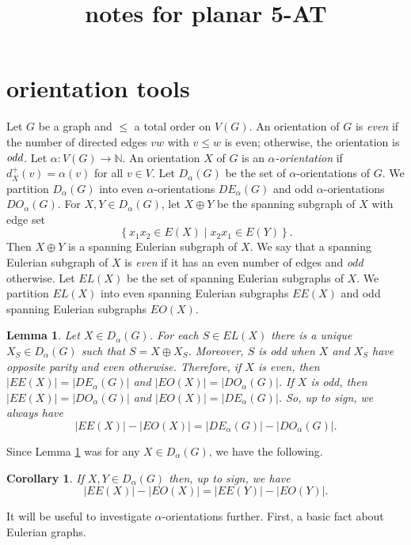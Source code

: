 \documentclass[12pt]{article}
\theoremstyle{plain}
\newtheorem{lem}[thm]{Lemma}
\newtheorem{cor}[thm]{Corollary}
\theoremstyle{definition}
\theoremstyle{remark}
\newcommand{\IN}{\mathbb{N}}
\newcommand{\setb}[3]{\left\{ #1 \in #2 \mid #3 \right\}}
\newcommand{\func}[3]{#1\colon #2 \rightarrow #3}
\begin{document}
\title{notes for planar 5-AT}
\author{}
\maketitle

\section{orientation tools}
Let $G$ be a graph and $\le$ a total order on $V(G)$.  
An orientation of $G$ is \emph{even} if the number of directed edges $vw$ with $v \le w$ is even; otherwise, the orientation is $\emph{odd}$.
Let $\func{\alpha}{V(G)}{\IN}$.  An orientation $X$ of $G$ is an \emph{$\alpha$-orientation} if $d_X^+(v) = \alpha(v)$ for all $v \in V$.  Let $D_\alpha(G)$ be the set
of $\alpha$-orientations of $G$.  We partition $D_\alpha(G)$ into even $\alpha$-orientations $DE_\alpha(G)$ and odd $\alpha$-orientations $DO_\alpha(G)$.  
For $X, Y \in D_\alpha(G)$, let $X \oplus Y$ be the spanning subgraph of $X$ with edge set 
\[\setb{x_1x_2}{E(X)}{x_2x_1 \in E(Y)}.\]
Then $X \oplus Y$ is a spanning Eulerian subgraph of $X$.  We say that a spanning Eulerian subgraph of $X$ is \emph{even} if it has an even number of edges and \emph{odd} otherwise.  
Let $EL(X)$ be the set of spanning Eulerian subgraphs of $X$.  We partition $EL(X)$ into even spanning Eulerian subgraphs $EE(X)$ and odd spanning Eulerian subgraphs $EO(X)$.  

\begin{lem}\label{EulerianDifferenceIsEvenOddDifference}
	Let $X \in D_\alpha(G)$.  For each $S \in EL(X)$ there is a unique $X_S \in D_\alpha(G)$ such that $S = X \oplus X_S$.  Moreover, $S$ is odd when $X$ and $X_S$ have opposite parity and even otherwise.
	Therefore, if $X$ is even, then $|EE(X)| = |DE_\alpha(G)|$ and $|EO(X)| = |DO_\alpha(G)|$.  If $X$ is odd, then $|EE(X)| = |DO_\alpha(G)|$ and $|EO(X)| = |DE_\alpha(G)|$.  
	So, up to sign, we always have
	\[|EE(X)| - |EO(X)| = |DE_\alpha(G)| - |DO_\alpha(G)|.\]
\end{lem}

Since Lemma \ref{EulerianDifferenceIsEvenOddDifference} was for any $X \in D_\alpha(G)$, we have the following.
\begin{cor}
	If $X, Y \in D_\alpha(G)$ then, up to sign, we have	
	\[|EE(X)| - |EO(X)| = |EE(Y)| - |EO(Y)|.\]
\end{cor}

It will be useful to investigate $\alpha$-orientations further.  First, a basic fact about Eulerian graphs.
\end{document}
